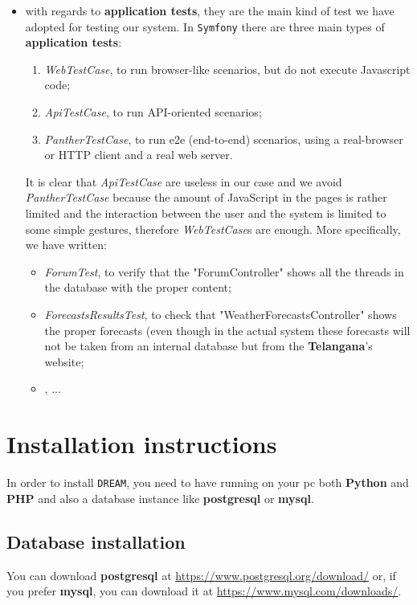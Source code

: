 \documentclass{article}
\begin{document}
\begin{itemize}
    \item with regards to \textbf{application tests}, they are the main kind of test we have adopted for testing our system. In \verb|Symfony| there are three main types of \textbf{application tests}:
    \begin{enumerate}
        \item \textit{WebTestCase}, to run browser-like scenarios, but do not execute Javascript code;
        \item \textit{ApiTestCase}, to run API-oriented scenarios;
        \item \textit{PantherTestCase}, to run e2e (end-to-end) scenarios, using a real-browser or HTTP client and a real web server.
    \end{enumerate}
    It is clear that \textit{ApiTestCase} are useless in our case and we avoid \textit{PantherTestCase} because the amount of JavaScript in the pages is rather limited and the interaction between the user and the system is limited to some simple gestures, therefore \textit{WebTestCase}s are enough. More specifically, we have written:
    \begin{itemize}
        \item \textit{ForumTest}, to verify that the "ForumController" shows all the threads in the database with the proper content;
        \item \textit{ForecastsResultsTest}, to check that "WeatherForecastsController" shows the proper forecasts (even though in the actual system these forecasts will not be taken from an internal database but from the \textbf{Telangana}'s website;
        \item \textit{}, ...
    \end{itemize}
\end{itemize}
\newpage
\section{Installation instructions}
In order to install \verb|DREAM|, you need to have running on your pc both \textbf{Python} and \textbf{PHP} and also a database instance like \textbf{postgresql} or \textbf{mysql}.\\
\subsection{Database installation}
You can download \textbf{postgresql} at \url{https://www.postgresql.org/download/} or, if you prefer \textbf{mysql}, you can download it at \url{https://www.mysql.com/downloads/}.
\end{document}
